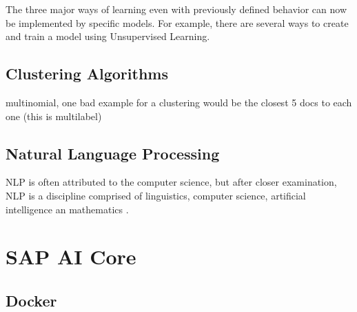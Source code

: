 The three major ways of learning even with previously defined behavior can now be implemented by specific models. For example, there are several ways to create and train a model using Unsupervised Learning.

\subsection{Clustering Algorithms}
multinomial, one bad example for a clustering would be the closest 5 docs to each one (this is multilabel)

\subsection{Natural Language Processing}
\ac{NLP} is often attributed to the computer science, but after closer examination, \ac{NLP} is a discipline comprised of linguistics, computer science, artificial intelligence an mathematics \cite{chowdhury2003}.

\section{SAP AI Core}
\subsection{Docker}
